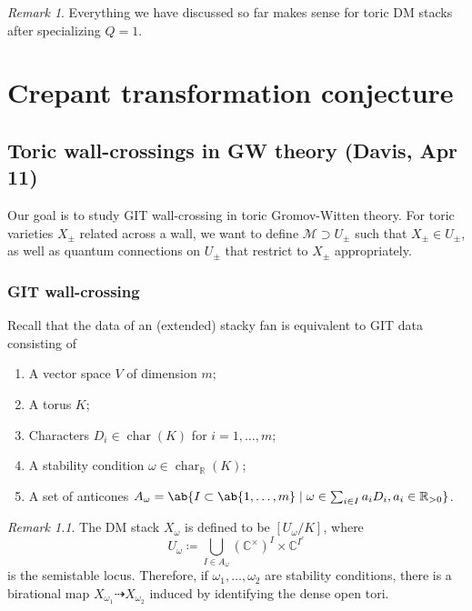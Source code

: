 \documentclass[leqno, openany]{memoir}
\theoremstyle{definition}
\theoremstyle{remark}
\newtheorem{rmk}[thm]{Remark}
\theoremstyle{plain}
\theoremstyle{definition}
\theoremstyle{remark}
\newcommand{\R}{\mathbb{R}}
\newcommand{\C}{\mathbb{C}}
\newcommand{\mc}[1]{\mathcal{#1}}
\newcommand{\on}[1]{\operatorname{#1}}
\begin{document}
\begin{rmk}
    Everything we have discussed so far makes sense for toric DM stacks after specializing $Q=1$.
\end{rmk}

\chapter{Crepant transformation conjecture}%
\label{cha:Crepant transformation conjecture}

\section{Toric wall-crossings in GW theory (Davis, Apr 11)}%
\label{sec:Toric wall-crossings}


Our goal is to study GIT wall-crossing in toric Gromov-Witten theory. For toric varieties $X_{\pm}$ related across a wall, we want to define $\mc{M} \supset U_{\pm}$ such that $X_{\pm} \in U_{\pm}$, as well as quantum connections on $U_{\pm}$ that restrict to $X_{\pm}$ appropriately.

\subsection{GIT wall-crossing}%
\label{sub:GIT wall-crossing}

Recall that the data of an (extended) stacky fan is equivalent to GIT data consisting of
\begin{enumerate}
    \item A vector space $V$ of dimension $m$;
    \item A torus $K$;
    \item Characters $D_i \in \on{char}(K)$ for $i=1,\ldots,m$;
    \item A stability condition $\omega \in \on{char}_{\R}(K)$;
    \item A set of anticones $A_{\omega} = \ab\{I \subset \ab\{1,\ldots,m\}\mid \omega \in \sum_{i\in I} a_i D_i, a_i \in \R_{>0}\}$.
\end{enumerate}

\begin{rmk}
    The DM stack $X_{\omega}$ is defined to be $[U_{\omega}/K]$, where
    \[ U_{\omega} \coloneqq \bigcup_{I \in A_{\omega}} (\C^{\times})^I \times \C^{I^c} \]
    is the semistable locus. Therefore, if $\omega_1, \ldots, \omega_2$ are stability conditions, there is a birational map $X_{\omega_1} \dashrightarrow X_{\omega_2}$ induced by identifying the dense open tori.
\end{rmk}
\end{document}

